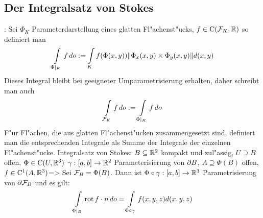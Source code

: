 \subsection{Der Integralsatz von Stokes}
:{
  Sei $\Phi_K$ Parameterdarstellung eines glatten Fl"achenst"ucks, 
  $f\in\SetCont(\cal F_K,\SetR)$ so definiert man
  \[\int_{\Phi|_K} f\, do:=
    \int_K f(\Phi(x,y))\norm{\Phi_x(x,y)\times\Phi_y(x,y)}d(x,y)
    \]
  Dieses Integral bleibt bei geeigneter Umparametrisierung erhalten, daher
  schreibt man auch
  \[\int_{\cal F_K}f\,do:=\int_{\Phi|_K} f\, do
    \]
  F"ur Fl"achen, die aus glatten Fl"achenst"ucken zusammengesetzt sind, 
  definiert man die entsprechenden Integrale als Summe der Integrale der
  einzelnen Fl"achenst"ucke.
  }
\theorem Integralsatz von Stokes:
  $B\subseteq\SetR^2$ kompakt und zul"assig, 
  $U\supseteq B$ offen, $\Phi\in\SetCont(U,\SetR^3)$ 
  $\gamma:[a,b]\to\SetR^2$ Parameterisierung von $\rim B$,
  $A\supseteq\Phi(B)$ offen, $f\in\SetCont^1(A,\SetR^3)$=>{
  Sei $\cal F_B=\Phi(B)$.
  Dann ist $\Phi\circ\gamma:[a,b]\to\SetR^3$ Parametrisierung von 
  $\rim{\cal F_B}$ und es gilt:
  \[\int_{\Phi|_B} \rot f\cdot n\,do=\int_{\Phi\circ\gamma}f(x,y,z)d(x,y,z)
    \]
  }
